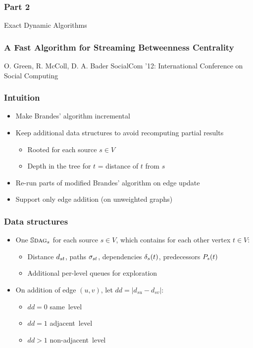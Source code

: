 
\begin{frame}
  \frametitle{Part 2}
  \centering
  \Huge Exact Dynamic Algorithms
\end{frame}


\begin{frame}
  \frametitle{A Fast Algorithm for Streaming Betweenness Centrality}
  \centering
  \vfill
  {\huge O. Green, R. McColl, D. A. Bader}
  \vfill
  {\large SocialCom '12: International Conference on Social Computing}
\end{frame}

\begin{frame}
  \frametitle{Intuition}

  \begin{itemize}
    \item Make Brandes' algorithm incremental
    \item Keep additional data structures to avoid recomputing partial results
    \begin{itemize}
      \item Rooted \spdag for each source $s \in V$
      \item Depth in the tree for $t$ = distance of $t$ from $s$
    \end{itemize}
    \item Re-run parts of modified Brandes' algorithm on edge update
    \item Support only edge addition (on unweighted graphs)
  \end{itemize}
    
\end{frame}


\begin{frame}
  \frametitle{Data structures}

  \begin{itemize}
    \item One $\mathbb{S}\textsc{dag}_s$ for each source $s \in V$, which contains for each other vertex $t \in V$:
    \begin{itemize}
      \item Distance $d_{st}$, paths $\sigma_{st}$, dependencies $\delta_{s}(t)$, predecessors $P_{s}(t)$
      \item Additional per-level queues for exploration
    \end{itemize}
  \end{itemize}
  \begin{itemize}
    \item On addition of edge $(u,v)$, let $dd = |d_{su} - d_{sv}|$:
    \begin{itemize}
      \item $dd = 0$ same~level
      \item $dd = 1$ adjacent~level
      \item $dd > 1$ non-adjacent~level
    \end{itemize}
  \end{itemize}
      
\end{frame}


